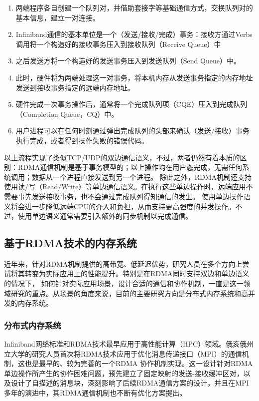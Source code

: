 \begin{enumerate}
	\item 两端程序各自创建一个队列对，并借助套接字等基础通信方式，交换队列对的基本信息，建立一对连接。
	\item Infiniband通信的基本单位是一个（发送/接收/完成）事务：接收方通过Verbs调用将一个构造好的接收事务压入到接收队列（Receive Queue）中
	\item 之后发送方将一个构造好的发送事务压入到发送队列（Send Queue）中。
	\item 此时，硬件将为两端处理这一对事务，将本机内存从发送事务指定的内存地址发送到接收事务指定的远端内存地址。
	\item 硬件完成一次事务操作后，通常将一个完成队列项（CQE）压入到完成队列（Completion Queue，CQ）中。
	\item 用户进程可以在任何时刻通过弹出完成队列的头部来确认（发送/接收）事务执行完成，或者得到操作失败的错误代码。
\end{enumerate}

以上流程实现了类似TCP/UDP的双边通信语义，不过，两者仍然有着本质的区别：RDMA通信机制是基于事务模型的；以上操作均在用户态完成，无需任何系统调用；数据从一个进程直接发送到另一个进程。
除此之外，RDMA机制还支持使用读/写（Read/Write）等单边通信语义。在执行这些单边操作时，远端应用不需要事先发送接收事务，也不会通过完成队列得知通信的发生。
使用单边操作语义将会进一步降低远端CPU的介入和负担，从而支持更高强度的并发操作。不过，使用单边语义通常需要引入额外的同步机制以完成通信。

\subsection{基于RDMA技术的内存系统}

近年来，针对RDMA机制提供的高带宽、低延迟优势，研究人员在多个方向上尝试将其转变为实际应用上的性能提升。特别是在RDMA同时支持双边和单边语义的情况下，
如何针对实际应用场景，设计合适的通信和协作机制，一直是这一领域研究的重点。从场景的角度来说，目前的主要研究方向是分布式内存系统和高并发的内存系统。

\subsubsection{分布式内存系统}

Infiniband网络标准和RDMA技术最早应用于高性能计算（HPC）领域。俄亥俄州立大学的研究人员\cite{liu2004high}首次将RDMA技术应用于优化消息传递接口（MPI）的通信机制，这也是最早的、较为完善的一个RDMA
协作机制实现。这一设计针对RDMA单边操作所产生的协作困难问题，预先建立了固定映射的发送-接收缓冲区对，以及设计了自描述的消息块，深刻影响了后续RDMA通信方案的设计\cite{mitchell2013using}\cite{kalia2014using}\cite{su2017rfp}。并且在MPI
多年的演进中，其RDMA通信机制也不断有优化方案提出\cite{sur2006rdma}\cite{wang2013gpu}。


